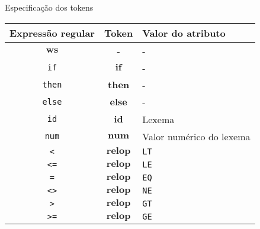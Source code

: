 \begin{frame}[fragile]{Especificação dos tokens}

    \begin{table}
        \centering

    \begin{tabularx}{0.7\textwidth}{ccX}
        \toprule
        \textbf{Expressão regular} & \textbf{Token} & \textbf{Valor do atributo} \\
        \midrule
        $\mathbf{ws}$ & - & - \\
        \texttt{if} & $\mathbf{if}$ & - \\
        \texttt{then} & $\mathbf{then}$ & - \\
        \texttt{else} & $\mathbf{else}$ & - \\
        \texttt{id} & $\mathbf{id}$ & Lexema \\
        \texttt{num} & $\mathbf{num}$ & Valor numérico do lexema \\
        \texttt{<} & $\mathbf{relop}$ & \texttt{LT} \\
        \texttt{<=} & $\mathbf{relop}$ & \texttt{LE} \\
        \texttt{=} & $\mathbf{relop}$ & \texttt{EQ} \\
        \texttt{<>} & $\mathbf{relop}$ & \texttt{NE} \\
        \texttt{>} & $\mathbf{relop}$ & \texttt{GT} \\
        \texttt{>=} & $\mathbf{relop}$ & \texttt{GE} \\
        \bottomrule
    \end{tabularx}
    \end{table}

\end{frame}

